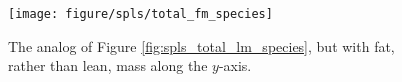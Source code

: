 \documentclass{article}
\begin{document}
\begin{figure}[ht]
  \centering
  \texttt{[image: figure/spls/total\_fm\_species]}
  \caption{The analog of Figure \ref{fig:spls_total_lm_species}, but with fat,
    rather than lean, mass along the $y$-axis. \label{fig:spls_total_fm_species}
  }
\end{figure}



\end{document}
